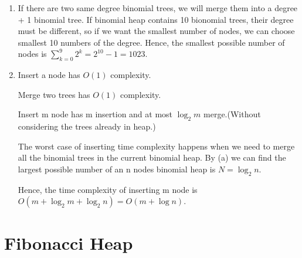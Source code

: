 \documentclass[12pt,a4paper]{article}
\begin{document}
\begin{enumerate}
    \item [(a)] 
        If there are two same degree binomial trees, we will merge them into a degree + 1 binomial tree.
        If binomial heap contains 10 bionomial trees, their degree must be different, so if we want the smallest number of nodes, we can choose smallest 10 numbers of the degree.
        Hence, the smallest possible number of nodes is $\sum_{k=0}^{9} 2^k = 2^10 - 1 = 1023$.
    \item [(b)]
        Insert a node has $O(1)$ complexity.
        
        Merge two trees has $O(1)$ complexity.

        Insert m node has m insertion and at most $\log_{2}m$ merge.(Without considering the trees already in heap.)

        The worst case of inserting time complexity happens when we need to merge all the binomial trees in the current binomial heap.
        By (a) we can find the largest possible number of an n nodes binomial heap is $N = \log_{2}n$.

        Hence, the time complexity of inserting m node is $O(m + \log_{2}m + \log_{2}n) = O(m + \log n)$.
        
\end{enumerate}

\section{Fibonacci Heap}    
\end{document}
